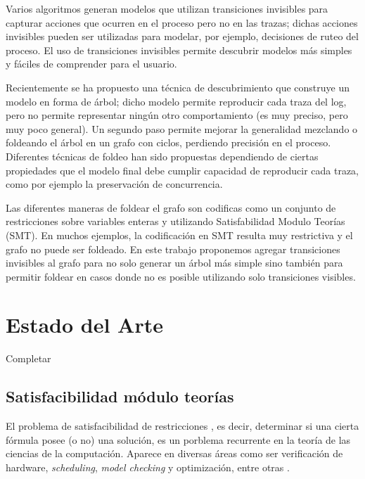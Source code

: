 \documentclass{llncs}
\begin{document}
Varios algoritmos generan modelos que utilizan transiciones invisibles para capturar acciones que ocurren en el proceso pero no en las trazas; dichas acciones invisibles pueden ser utilizadas para 
modelar, por ejemplo, decisiones de ruteo del proceso. El uso de transiciones invisibles permite descubrir modelos más simples y fáciles de comprender para el usuario.

Recientemente se ha propuesto una técnica de descubrimiento que construye un modelo en forma de árbol;
dicho modelo permite reproducir cada traza del log, pero no permite representar ningún otro comportamiento (es muy preciso, pero muy poco general). Un segundo paso permite mejorar la generalidad mezclando o foldeando el árbol en un grafo con ciclos, perdiendo precisión en el proceso. Diferentes técnicas de foldeo han sido propuestas 
dependiendo de ciertas propiedades que el modelo final debe cumplir capacidad de reproducir cada traza, como por ejemplo la preservación de concurrencia.

Las diferentes maneras de foldear el grafo son codificas como un conjunto de restricciones sobre variables enteras y utilizando Satisfabilidad Modulo Teorías (SMT).
En muchos ejemplos, la codificación en SMT resulta muy restrictiva y el grafo no puede ser foldeado. En este trabajo proponemos agregar transiciones invisibles al grafo para no solo generar un árbol más simple sino también para permitir foldear en casos donde no es posible utilizando solo transiciones visibles.


\section{Estado del Arte}

Completar

\iffalse
\subsection{Satisfacibilidad módulo teorías}

El problema de satisfacibilidad de restricciones , es decir, determinar si una cierta fórmula posee (o no) una solución, es un porblema recurrente en la teoría de las ciencias de la computación. Aparece en diversas áreas como ser verificación de hardware, \textit{scheduling}, \textit{model checking} y optimización, entre otras \cite{BjornerDeMoura2009}\cite{NieuwenhuisO06}.%
\end{document}
